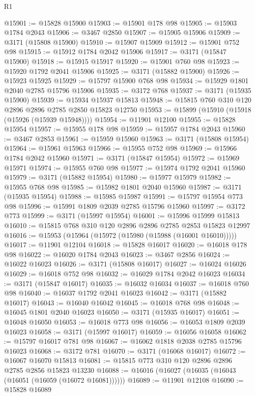 \begin{lexlean}{R1}
\begin{coremodule}
@15901 := @15828 @15900
@15903 := @15901 @178 @98
@15905 := @15903 @1784 @2043
@15906 := @3467 @2850
@15907 := @15905 @15906
@15909 := @3171 (@15808 @15900)
@15910 := @15907 @15909
@15912 := @15901 @752 @98
@15915 := @15912 @1784 @2042 @15906
@15917 := @3171 (@15847 @15900)
@15918 := @15915 @15917
@15920 := @15901 @760 @98
@15923 := @15920 @1792 @2041 @15906
@15925 := @3171 (@15882 @15900)
@15926 := @15923 @15925
@15929 := @15797 @15900 @768 @98
@15934 := @15929 @1801 @2040 @2785 @15796 @15906
@15935 := @3172 @768
@15937 := @3171 (@15935 @15900)
@15939 := @15934 @15937 @15813
@15948 := @15815 @760 @310 @120 @2896 @2896 @2785 @2850 @15823 @12750
@15953 := @15899 (@15910 (@15918 (@15926 (@15939 @15948))))
@15954 := @11901 @12100
@15955 := @15828 @15954
@15957 := @15955 @178 @98
@15959 := @15957 @1784 @2043
@15960 := @3467 @2853
@15961 := @15959 @15960
@15963 := @3171 (@15808 @15954)
@15964 := @15961 @15963
@15966 := @15955 @752 @98
@15969 := @15966 @1784 @2042 @15960
@15971 := @3171 (@15847 @15954)
@15972 := @15969 @15971
@15974 := @15955 @760 @98
@15977 := @15974 @1792 @2041 @15960
@15979 := @3171 (@15882 @15954)
@15980 := @15977 @15979
@15982 := @15955 @768 @98
@15985 := @15982 @1801 @2040 @15960
@15987 := @3171 (@15935 @15954)
@15988 := @15985 @15987
@15991 := @15797 @15954 @773 @98
@15996 := @15991 @1809 @2039 @2785 @15796 @15960
@15997 := @3172 @773
@15999 := @3171 (@15997 @15954)
@16001 := @15996 @15999 @15813
@16010 := @15815 @768 @310 @120 @2896 @2896 @2785 @2853 @15823 @12997
@16016 := @15953 (@15964 (@15972 (@15980 (@15988 (@16001 @16010)))))
@16017 := @11901 @12104
@16018 := @15828 @16017
@16020 := @16018 @178 @98
@16022 := @16020 @1784 @2043
@16023 := @3467 @2856
@16024 := @16022 @16023
@16026 := @3171 (@15808 @16017)
@16027 := @16024 @16026
@16029 := @16018 @752 @98
@16032 := @16029 @1784 @2042 @16023
@16034 := @3171 (@15847 @16017)
@16035 := @16032 @16034
@16037 := @16018 @760 @98
@16040 := @16037 @1792 @2041 @16023
@16042 := @3171 (@15882 @16017)
@16043 := @16040 @16042
@16045 := @16018 @768 @98
@16048 := @16045 @1801 @2040 @16023
@16050 := @3171 (@15935 @16017)
@16051 := @16048 @16050
@16053 := @16018 @773 @98
@16056 := @16053 @1809 @2039 @16023
@16058 := @3171 (@15997 @16017)
@16059 := @16056 @16058
@16062 := @15797 @16017 @781 @98
@16067 := @16062 @1818 @2038 @2785 @15796 @16023
@16068 := @3172 @781
@16070 := @3171 (@16068 @16017)
@16072 := @16067 @16070 @15813
@16081 := @15815 @773 @310 @120 @2896 @2896 @2785 @2856 @15823 @13230
@16088 := @16016 (@16027 (@16035 (@16043 (@16051 (@16059 (@16072 @16081))))))
@16089 := @11901 @12108
@16090 := @15828 @16089

\end{coremodule}
\end{lexlean}
